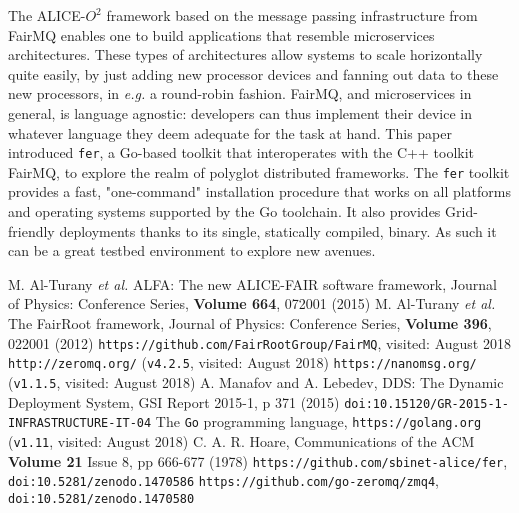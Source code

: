 \documentclass{webofc}
\begin{document}
The ALICE-$O^2$ framework based on the message passing infrastructure from FairMQ enables one to build applications that resemble microservices architectures.
These types of architectures allow systems to scale horizontally quite easily, by just adding new processor devices and fanning out data to these new processors, in \emph{e.g.} a round-robin fashion.
FairMQ, and microservices in general, is language agnostic: developers can thus implement their device in whatever language they deem adequate for the task at hand.
This paper introduced \texttt{fer}, a Go-based toolkit that interoperates with the C++ toolkit FairMQ, to explore the realm of polyglot distributed frameworks.
The \texttt{fer} toolkit provides a fast, "one-command" installation procedure that works on all platforms and operating systems supported by the Go toolchain.
It also provides Grid-friendly deployments thanks to its single, statically compiled, binary.
As such it can be a great testbed environment to explore new avenues.


\begin{thebibliography}{}

 M. Al-Turany \emph{et al.} ALFA: The new ALICE-FAIR software framework, Journal of Physics: Conference Series, \textbf{Volume 664}, 072001 (2015)
 M. Al-Turany \emph{et al.} The FairRoot framework, Journal of Physics: Conference Series, \textbf{Volume 396}, 022001 (2012)
 \texttt{https://github.com/FairRootGroup/FairMQ}, visited: August 2018
 \texttt{http://zeromq.org/} (\texttt{v4.2.5}, visited: August 2018)
 \texttt{https://nanomsg.org/} (\texttt{v1.1.5}, visited: August 2018)
 A. Manafov and A. Lebedev, DDS: The Dynamic Deployment System, GSI Report 2015-1, p 371 (2015) \texttt{doi:10.15120/GR-2015-1-INFRASTRUCTURE-IT-04}
 The \texttt{Go} programming language, \texttt{https://golang.org} (\texttt{v1.11}, visited: August 2018)
 C. A. R. Hoare, Communications of the ACM \textbf{Volume 21} Issue 8, pp 666-677 (1978)
 \texttt{https://github.com/sbinet-alice/fer}, \texttt{doi:10.5281/zenodo.1470586}
 \texttt{https://github.com/go-zeromq/zmq4}, \texttt{doi:10.5281/zenodo.1470580}

\end{thebibliography}
\end{document}
